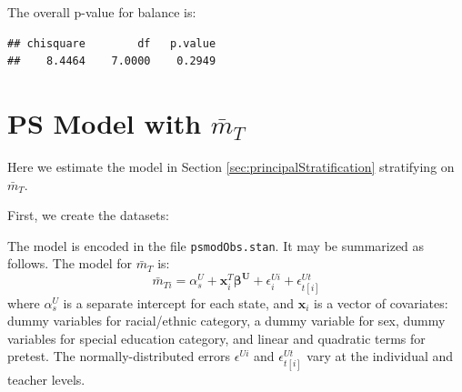 \documentclass{article}
\begin{document}
The overall p-value for balance is:
\begin{knitrout}
\color{fgcolor}\begin{kframe}
\begin{alltt}
 
 \hlkwb{<-} \hlopt{~}\hlstd{)}\hlopt{+}\hlopt{+}\hlopt{+}\hlopt{+}\hlopt{+}\hlstd{=}\hlstd{)}
\hlopt{$}\hlstd{overall[}\hlstd{,])}
\end{alltt}
\begin{verbatim}
## chisquare        df   p.value 
##    8.4464    7.0000    0.2949
\end{verbatim}
\end{kframe}
\end{knitrout}

\section{PS Model with $\bar{m}_T$}

Here we estimate the model in Section
\ref{sec:principalStratification} stratifying on $\bar{m}_T$.

First, we create the datasets:
\begin{kframe}
\begin{alltt}
\hlstd{(}\hlstd{)}
\end{alltt}
\end{kframe}

The model is encoded in the file \texttt{psmodObs.stan}.
It may be summarized as follows.
The model for $\bar{m}_T$ is:
\begin{equation}\label{eq:mbarUsage}
\bar{m}_{Ti}=\alpha^U_s+\bm{x}_i^T\bm{\beta^U}+\epsilon^{Ui}_i+\epsilon^{Ut}_{t[i]}
\end{equation}
where $\alpha^U_s$ is a separate intercept for each state, and $\bm{x}_i$ is a vector of covariates: dummy variables for
racial/ethnic category, a dummy variable for sex, dummy variables for
special education category, and linear and quadratic terms for
pretest.
The normally-distributed errors $\epsilon^{Ui}$ and $\epsilon^{Ut}_{t[i]}$ vary at the
individual and teacher levels.
\end{document}
